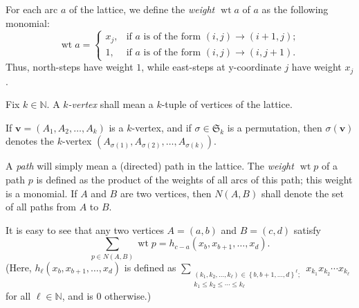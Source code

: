 \documentclass[reqno]{amsart}%
\newcommand{\0}{\phantom{c}}
\let\sumnonlimits\sum
\renewcommand{\sum}{\sumnonlimits\limits}
\newenvironment{verlong}{}{}
\newcommand{\defn}[1]{{\color{darkred}\emph{#1}}}
\theoremstyle{plain}
\theoremstyle{definition}
\numberwithin{equation}{section}
\begin{document}
For each arc $a$ of the lattice, we define the
\defn{weight $\operatorname{wt}a$} of $a$ as the following monomial:%
\[
\operatorname*{wt}a=%
\begin{cases}
x_{j}, & \text{if }a\text{ is of the form }\left(  i,j\right)  \rightarrow
\left(  i+1,j\right)  ;\\
1, & \text{if }a\text{ is of the form }\left(  i,j\right)  \rightarrow\left(
i,j+1\right)  .
\end{cases}
\]
Thus, north-steps have weight $1$, while east-steps at y-coordinate $j$ have
weight $x_{j}$.

Fix $k\in\mathbb{N}$. A \defn{$k$-vertex} shall mean a $k$-tuple of vertices
of the lattice.

\begin{verlong}
If $\mathbf{v}=\left(  A_{1},A_{2},\ldots,A_{k}\right)  $ is a
$k$-vertex, and if $\sigma\in\mathfrak{S}_{k}$ is a permutation, then
$\sigma\left(  \mathbf{v}\right)  $ denotes the $k$-vertex $\left(
A_{\sigma\left(  1\right)  },A_{\sigma\left(  2\right)  },\ldots
,A_{\sigma\left(  k\right)  }\right)  $.
\end{verlong}

A \defn{path} will simply mean a (directed) path in the lattice. The
\defn{weight $\operatorname{wt}p$} of a path $p$ is defined as the product of
the weights of all arcs of this path; this weight is a monomial. If $A$ and
$B$ are two vertices, then \defn{$N\left(  A,B\right)$} shall denote the set
of all paths from $A$ to $B$.

It is easy to see that any two vertices $A=\left(  a,b\right)  $ and
$B=\left(  c,d\right)  $ satisfy%
\begin{equation}
\sum_{p\in N\left(  A,B\right)  }\operatorname*{wt}p=h_{c-a}\left(
x_{b},x_{b+1},\ldots,x_{d}\right)  . \label{eq.LGV.single-paths}%
\end{equation}
(Here, $h_{\ell}\left(  x_{b},x_{b+1},\ldots,x_{d}\right)  $ is defined as
$\sum_{\substack{\left(  k_{1},k_{2},\ldots,k_{\ell}\right)  \in\left\{
b,b+1,\ldots,d\right\}  ^{\ell};\\k_{1}\leq k_{2}\leq\cdots\leq k_{\ell}%
}}x_{k_{1}}x_{k_{2}}\cdots x_{k_{\ell}}$ for all $\ell\in\mathbb{N}$, and is
$0$ otherwise.)
\end{document}
